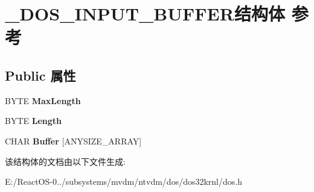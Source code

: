 \hypertarget{struct___d_o_s___i_n_p_u_t___b_u_f_f_e_r}{}\section{\+\_\+\+D\+O\+S\+\_\+\+I\+N\+P\+U\+T\+\_\+\+B\+U\+F\+F\+E\+R结构体 参考}
\label{struct___d_o_s___i_n_p_u_t___b_u_f_f_e_r}
\subsection*{Public 属性}
\begin{DoxyCompactItemize}
\item 
\mbox{\label{struct___d_o_s___i_n_p_u_t___b_u_f_f_e_r_a38e4f9de754e8d32ae93a8001fea5996}} 
B\+Y\+TE {\bfseries Max\+Length}
\item 
\mbox{\label{struct___d_o_s___i_n_p_u_t___b_u_f_f_e_r_ab8db39efcdf9858877203f18bd9b1c79}} 
B\+Y\+TE {\bfseries Length}
\item 
\mbox{\label{struct___d_o_s___i_n_p_u_t___b_u_f_f_e_r_a381407cf8099abe917599c763a3b3522}} 
C\+H\+AR {\bfseries Buffer} \mbox{[}A\+N\+Y\+S\+I\+Z\+E\+\_\+\+A\+R\+R\+AY\mbox{]}
\end{DoxyCompactItemize}


该结构体的文档由以下文件生成\+:\begin{DoxyCompactItemize}
\item 
E\+:/\+React\+O\+S-\/0../subsystems/mvdm/ntvdm/dos/dos32krnl/dos.\+h\end{DoxyCompactItemize}
